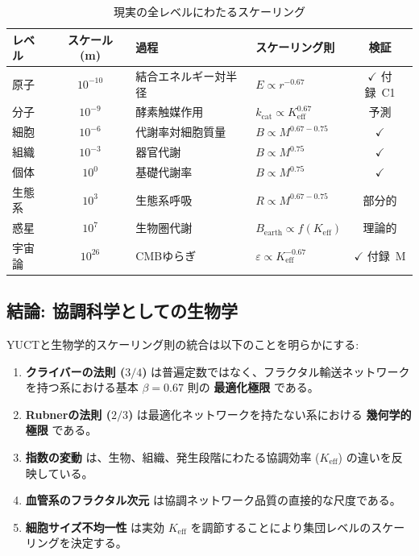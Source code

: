 \documentclass[12pt]{article}
\newcommand{\Keff}{K_{\mathrm{eff}}}
\begin{document}
	\begin{table}[htbp]
		\centering
		\caption{現実の全レベルにわたるスケーリング}
		\label{tab:unified-hierarchy}
		\footnotesize
		\begin{tabular}{p{2.5cm} c p{4cm} p{3cm} c}
			\toprule
			\textbf{レベル} & \textbf{スケール (m)} & \textbf{過程} & \textbf{スケーリング則} & \textbf{検証} \\
			\midrule
			原子      & \(10^{-10}\) & 結合エネルギー対半径 & \(E \propto r^{-0.67}\) & $\checkmark$ 付録~C1 \\
			分子      & \(10^{-9}\)  & 酵素触媒作用        & \(k_{\text{cat}} \propto \Keff^{0.67}\) & 予測 \\
			細胞      & \(10^{-6}\)  & 代謝率対細胞質量 & \(B \propto M^{0.67-0.75}\) & $\checkmark$ \cite{Takemoto2015} \\
			組織      & \(10^{-3}\)  & 器官代謝        & \(B \propto M^{0.75}\) & $\checkmark$ \cite{West2002} \\
			個体      & \(10^{0}\)   & 基礎代謝率    & \(B \propto M^{0.75}\) & $\checkmark$ \cite{Kleiber1932} \\
			生態系    & \(10^{3}\)   & 生態系呼吸   & \(R \propto M^{0.67-0.75}\) & 部分的 \\
			惑星      & \(10^{7}\)   & 生物圏代謝    & \(B_{\text{earth}} \propto f(\Keff)\) & 理論的 \\
			宇宙論    & \(10^{26}\)  & CMBゆらぎ        & \(\varepsilon \propto \Keff^{-0.67}\) & $\checkmark$ 付録~M \\
			\bottomrule
		\end{tabular}
	\end{table}
	
	\subsection{結論: 協調科学としての生物学}
	
	YUCTと生物学的スケーリング則の統合は以下のことを明らかにする:
	
	\begin{enumerate}
		\item \textbf{クライバーの法則 (\(3/4\))} は普遍定数ではなく、フラクタル輸送ネットワークを持つ系における基本 \(\beta = 0.67\) 則の \textbf{最適化極限} である。
		\item \textbf{Rubnerの法則 (\(2/3\))} は最適化ネットワークを持たない系における \textbf{幾何学的極限} である。
		\item \textbf{指数の変動} は、生物、組織、発生段階にわたる協調効率 (\(\Keff\)) の違いを反映している。
		\item \textbf{血管系のフラクタル次元} は協調ネットワーク品質の直接的な尺度である。
		\item \textbf{細胞サイズ不均一性} は実効 \(\Keff\) を調節することにより集団レベルのスケーリングを決定する。
	\end{enumerate}
	
\end{document}
